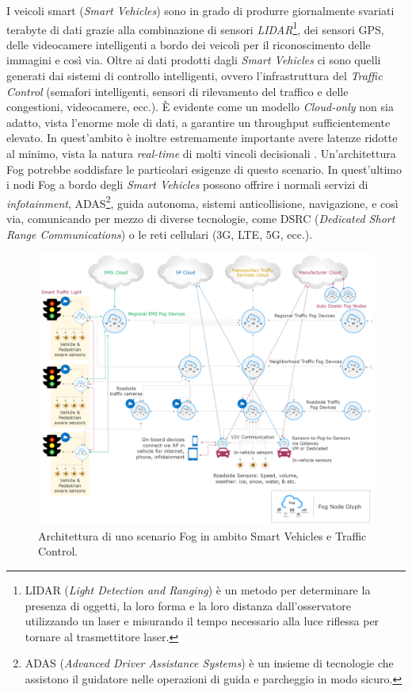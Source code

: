 I veicoli smart (\textit{Smart Vehicles}) sono in grado di produrre giornalmente svariati terabyte di dati grazie alla combinazione di sensori \textit{LIDAR}\footnote{LIDAR (\textit{Light Detection and Ranging}) è un metodo per determinare la presenza di oggetti, la loro forma e la loro distanza dall'osservatore utilizzando un laser e misurando il tempo necessario alla luce riflessa per tornare al trasmettitore laser.}, dei sensori GPS, delle videocamere intelligenti a bordo dei veicoli per il riconoscimento delle immagini e così via. Oltre ai dati prodotti dagli \textit{Smart Vehicles} ci sono quelli generati dai sistemi di controllo intelligenti, ovvero l'infrastruttura del \textit{Traffic Control} (semafori intelligenti, sensori di rilevamento del traffico e delle congestioni, videocamere, ecc.). È evidente come un modello \textit{Cloud-only} non sia adatto, vista l'enorme mole di dati, a garantire un throughput sufficientemente elevato. In quest'ambito è inoltre estremamente importante avere latenze ridotte al minimo, vista la natura \textit{real-time} di molti vincoli decisionali \cite{RealTimeDecisionMakingSmartVehicles}. Un'architettura Fog potrebbe soddisfare le particolari esigenze di questo scenario. In quest'ultimo i nodi Fog a bordo degli \textit{Smart Vehicles} possono offrire i normali servizi di \textit{infotainment}, ADAS\footnote{ADAS (\textit{Advanced Driver Assistance Systems}) è un insieme di tecnologie che assistono il guidatore nelle operazioni di guida e parcheggio in modo sicuro.}, guida autonoma, sistemi anticollisione, navigazione, e così via, comunicando per mezzo di diverse tecnologie, come DSRC (\textit{Dedicated Short Range Communications}) o le reti cellulari (3G, LTE, 5G, ecc.).

\begin{figure}[!ht]
  \includegraphics[width=14cm]{images/smartcars_trafficcontrol}
  \centering
  \caption[Architettura di uno scenario Fog in ambito Smart Vehicles e Traffic Control]{Architettura di uno scenario Fog in ambito Smart Vehicles e Traffic Control. \cite{OpenFogReferenceArchitecture}}
  \label{fig:smartcars_trafficcontrol}
\end{figure}

